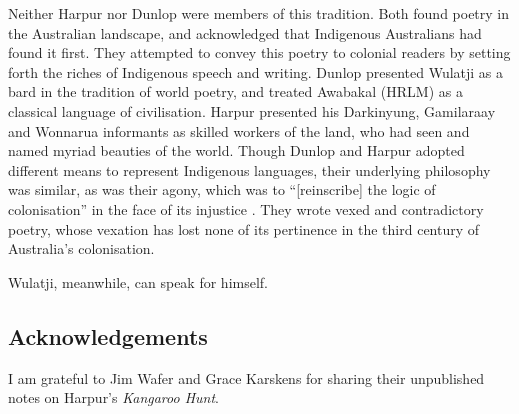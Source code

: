 \documentclass[
  Crown,
  times,
  sageh]{sagej}
\begin{document}
Neither Harpur nor Dunlop were members of this tradition. Both found
poetry in the Australian landscape, and acknowledged that Indigenous
Australians had found it first. They attempted to convey this poetry to
colonial readers by setting forth the riches of Indigenous speech and
writing. Dunlop presented Wulatji as a bard in the tradition of world
poetry, and treated Awabakal (HRLM) as a classical language of
civilisation. Harpur presented his Darkinyung, Gamilaraay and Wonnarua
informants as skilled workers of the land, who had seen and named myriad
beauties of the world. Though Dunlop and Harpur adopted different means
to represent Indigenous languages, their underlying philosophy was
similar, as was their agony, which was to ``{[}reinscribe{]} the logic
of colonisation'' in the face of its injustice
\citep[113]{minter_settlement_2021}. They wrote vexed and contradictory
poetry, whose vexation has lost none of its pertinence in the third
century of Australia's colonisation.

Wulatji, meanwhile, can speak for himself.

\subsection{Acknowledgements}\label{acknowledgements}

I am grateful to Jim Wafer and Grace Karskens for sharing their
unpublished notes on Harpur's \emph{Kangaroo Hunt}.


\end{document}
